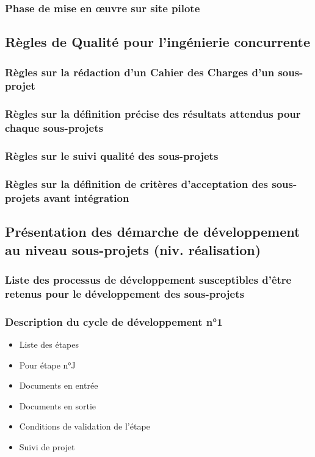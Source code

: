 \subsubsection{Phase de mise en œuvre sur site pilote}
\subsection{Règles de Qualité pour l’ingénierie concurrente}
\subsubsection{Règles sur la rédaction d’un Cahier des Charges d’un sous-projet}
\subsubsection{Règles sur la définition précise des résultats attendus pour chaque sous-projets}
\subsubsection{Règles sur le suivi qualité des sous-projets}
\subsubsection{Règles sur la définition de critères d’acceptation des sous-projets avant intégration}
\subsection{Présentation des démarche de développement au niveau sous-projets (niv. réalisation)}
\subsubsection{Liste des processus de développement susceptibles d’être retenus pour le développement des sous-projets}
\subsubsection{Description du cycle de développement n°1}
\begin{itemize}
  \item Liste des étapes
  \item Pour étape n°J
  \item Documents en entrée
  \item Documents en sortie
  \item Conditions de validation de l’étape
  \item Suivi de projet
\end{itemize}
 
